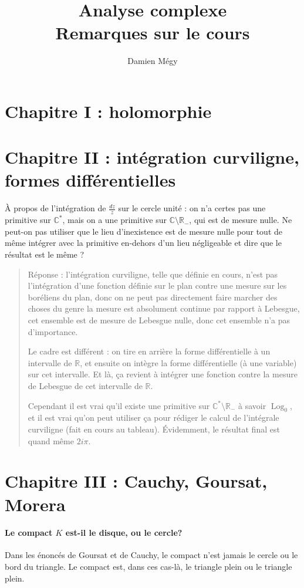 \documentclass[11pt,a4paper]{article}
\title{Analyse complexe\\ Remarques sur le cours\\}
\author{Damien Mégy}
\newcommand{\R}{\mathbb{R}}
\newcommand{\C}{\mathbb{C}}
\DeclareMathOperator{\Log}{\text{Log}}
\theoremstyle{definition}
\theoremstyle{plain}
\begin{document}
\maketitle
\tableofcontents

\section{Chapitre I : holomorphie}

\section{Chapitre II : intégration curviligne, formes différentielles}

À propos de l'intégration de $\frac{dz}{z}$ sur le cercle unité : on n'a certes pas une primitive sur $\C^*$, mais on a une primitive sur $\C\setminus \R_-$, qui est de mesure nulle.
Ne peut-on pas utiliser que le lieu d'inexistence est de mesure nulle pour tout de même intégrer avec la primitive en-dehors d'un lieu négligeable et dire que le résultat est le même ?

\begin{quote}
Réponse : l'intégration curviligne, telle que définie en cours, n'est pas l'intégration d'une fonction définie sur le plan contre une mesure sur les boréliens du plan, donc on ne peut pas directement faire marcher des choses du genre \og la mesure est absolument continue par rapport à Lebesgue, cet ensemble est de mesure de Lebesgue nulle, donc cet ensemble n'a pas d'importance.\fg{}

Le cadre est différent : on tire en arrière la forme différentielle à un intervalle de $\R$, et ensuite on intègre la forme différentielle (à une variable) sur cet intervalle. Et là, ça revient à intégrer une fonction contre la mesure de Lebesgue de cet intervalle de $\R$.
 
Cependant il est vrai qu'il existe une primitive sur $\C^*\setminus \R_-$ à savoir $\Log_0$, et il est vrai qu'on peut utiliser ça pour rédiger le calcul de l'intégrale curviligne (fait en cours au tableau). Évidemment, le résultat final est quand même $2i\pi$.
\end{quote}


\section{Chapitre III : Cauchy, Goursat, Morera}

\paragraph{\og Le compact $K$ est-il le disque, ou le cercle?\fg}
Dans les énoncés de Goursat et de Cauchy, le compact n'est jamais le cercle ou le bord du triangle. Le compact est, dans ces cas-là, le triangle plein ou le triangle plein.
\end{document}
